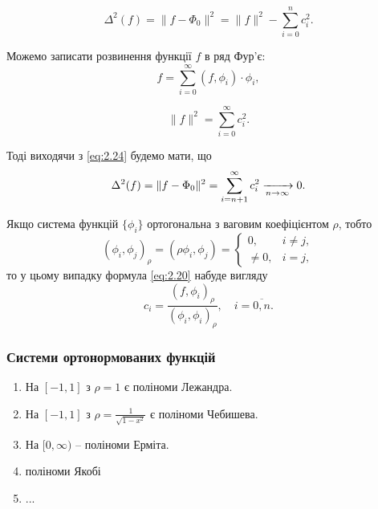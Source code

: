 \begin{equation}
	\label{eq:2.24}
	\Delta^2 (f) = \|f - \Phi_0\|^2 = \|f\|^2 - \sum_{i = 0}^n c_i^2.
\end{equation}

Можемо записати розвинення функції $f$ в ряд Фур'є:
\begin{equation}
	\label{eq:2.25}
	f = \sum_{i = 0}^\infty (f, \phi_i) \cdot \phi_i,
\end{equation}

\begin{equation*}
	\|f\|^2 = \sum_{i = 0}^\infty c_i^2.
\end{equation*}

Тоді виходячи з \eqref{eq:2.24} будемо мати, що
\begin{equation*}
	\Delta^2(f) = \| f - \Phi_0\|^2 = \displaystyle\sum\limits_{i = n + 1}^\infty c_i^2 \xrightarrow[n \to \infty]{} 0.
\end{equation*}

\begin{remark*}
	Якщо система функцій $\{\phi_i\}$ ортогональна з ваговим коефіцієнтом $\rho$, тобто 
	\begin{equation*}
		(\phi_i, \phi_j)_\rho = (\rho \phi_i, \phi_j) = \begin{cases} 0, & i \ne j, \\ \ne 0, & i = j, \end{cases}
	\end{equation*}
	то у цьому випадку формула \eqref{eq:2.20} набуде вигляду
	\begin{equation}
		\label{eq:2.27}
		c_i = \frac{(f, \phi_i)_\rho}{(\phi_i, \phi_i)_\rho}, \quad i = \overline{0, n}.
	\end{equation}
\end{remark*}

\subsubsection{Системи ортонормованих функцій}

\begin{enumerate}
	\item На $[-1, 1]$ з $\rho = 1$ є поліноми Лежандра.
	\item На $[-1, 1]$ з $\rho = \frac{1}{\sqrt{1 - x^2}}$ є поліноми Чебишева.
	\item На $[0, \infty)$ -- поліноми Ерміта.
	\item поліноми Якобі
	\item ...
\end{enumerate}

